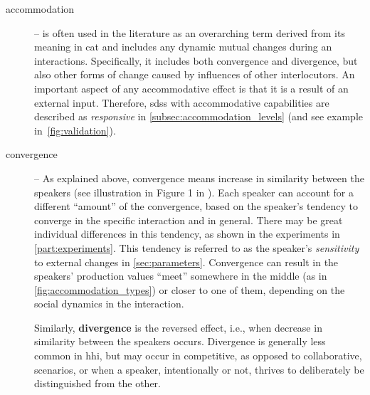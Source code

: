 \begin{description}
	\item[accommodation] -- is often used in the literature as an overarching term derived from its meaning in \ac{cat} and includes any dynamic mutual changes during an interactions.
	Specifically, it includes both convergence and divergence, but also other forms of change caused by influences of other interlocutors.
	An important aspect of any accommodative effect is that it is a result of an external input.
	Therefore, \acp{sds} with accommodative capabilities are described as \emph{responsive} in \cref{subsec:accommodation_levels} (and see example in~\cref{fig:validation}).
	
	\item[convergence] -- As explained above, convergence means increase in similarity between the speakers (see illustration in Figure 1 in \citet{Levitan2011measuring}).
	Each speaker can account for a different \enquote{amount} of the convergence, based on the speaker's tendency to converge in the specific interaction and in general.
	There may be great individual differences in this tendency, as shown in the experiments in \cref{part:experiments}.
	This tendency is referred to as the speaker's \emph{sensitivity} to external changes in \cref{sec:parameters}.
	Convergence can result in the speakers' production values \enquote{meet} somewhere in the middle (as in \cref{fig:accommodation_types}) or closer to one of them, depending on the social dynamics in the interaction.
	
	Similarly, \textbf{divergence} is the reversed effect, i.e., when decrease in similarity between the speakers occurs.
	Divergence is generally less common in \ac{hhi}, but may occur in competitive, as opposed to collaborative, scenarios, or when a speaker, intentionally or not, thrives to deliberately be distinguished from the other.
	

\end{description}
